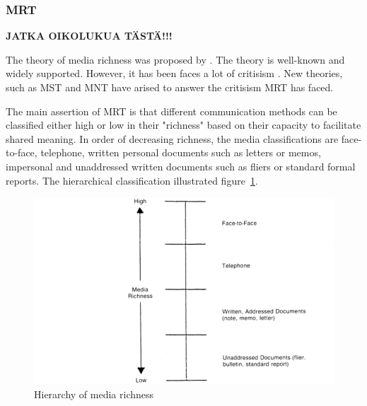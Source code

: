 \documentclass[english,12pt,a4paper,pdftex]{article}
\begin{document}
\subsubsection{\ac{MRT}}

\textbf{JATKA OIKOLUKUA TÄSTÄ!!!}

The theory of media richness was proposed by \citet{daft1986}. The theory is well-known and widely supported. However, it has been faces a lot of critisism \citep{dennis1999} \citep{korkala2006}. New theories, such as \ac{MST} and \ac{MNT} have arised to answer the critisism \ac{MRT} has faced.

The main assertion of \ac{MRT} is that different communication methods can be classified either high or low in their "richness" based on their capacity to facilitate shared meaning. In order of decreasing richness, the media classifications are face-to-face, telephone, written personal documents such as letters or memos, impersonal and unaddressed written documents such as fliers or standard formal reports. The hierarchical classification illustrated figure~\ref{fig:hierarchy_of_media_richness}.

\begin{figure}[htb]
\begin{center}
\includegraphics[width=1.0\textwidth]{hierarchy_of_media_richness.png}
\end{center}
\caption{Hierarchy of media richness \citep{daft1987}}
\label{fig:hierarchy_of_media_richness}
\end{figure}
\end{document}
